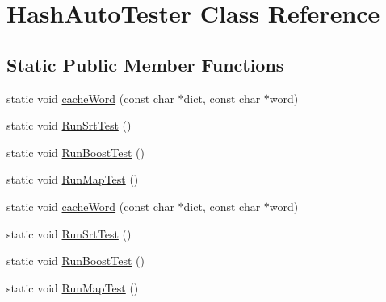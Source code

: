 \hypertarget{class_hash_auto_tester}{
\section{HashAutoTester Class Reference}
\label{class_hash_auto_tester}
}
\subsection*{Static Public Member Functions}
\begin{DoxyCompactItemize}
\item 
static void \hyperlink{class_hash_auto_tester_a1f4dd5fd48676c8628db938e98f05c58}{cacheWord} (const char $\ast$dict, const char $\ast$word)
\item 
static void \hyperlink{class_hash_auto_tester_a64737c4597eb070da7575f2e1ffe6979}{RunSrtTest} ()
\item 
static void \hyperlink{class_hash_auto_tester_acb600bed11abfb42725915e82d1660da}{RunBoostTest} ()
\item 
static void \hyperlink{class_hash_auto_tester_afa2764a23f631f9473b8997e86dd3399}{RunMapTest} ()
\item 
static void \hyperlink{class_hash_auto_tester_a1f4dd5fd48676c8628db938e98f05c58}{cacheWord} (const char $\ast$dict, const char $\ast$word)
\item 
static void \hyperlink{class_hash_auto_tester_a64737c4597eb070da7575f2e1ffe6979}{RunSrtTest} ()
\item 
static void \hyperlink{class_hash_auto_tester_acb600bed11abfb42725915e82d1660da}{RunBoostTest} ()
\item 
static void \hyperlink{class_hash_auto_tester_afa2764a23f631f9473b8997e86dd3399}{RunMapTest} ()
\end{DoxyCompactItemize}
